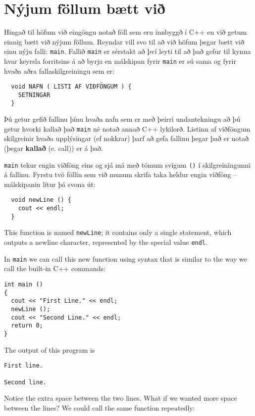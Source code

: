 \section{Nýjum föllum bætt við}

Hingað til höfum við eingöngu notað föll sem eru innbyggð í C++ en við getum einnig bætt við nýjum föllum.
Reyndar vill svo til að við höfum þegar bætt við einu nýju falli: {\tt main}.
Fallið {\tt main} er sérstakt að því leyti til að það gefur til kynna hvar keyrsla forritsins á að byrja en málskipan fyrir {\tt main} er sú sama og fyrir hvaða aðra fallaskilgreiningu sem er:

\begin{verbatim}
  void NAFN ( LISTI AF VIÐFÖNGUM ) {
    SETNINGAR
  }
\end{verbatim}
%
Þú getur gefið fallinu þínu hvaða nafn sem er með þeirri undantekningu að þú getur hvorki kallað það 
{\tt main} né notað annað C++ lykilorð.
Listinn af viðföngum skilgreinir hvaða upplýsingar (ef nokkrar) þarf að gefa fallinu þegar það er notað (þegar {\bf kallað} (e. call)) er á það.

{\tt main} tekur engin viðföng eins og sjá má með tómum svigum {\tt ()} í skilgreiningunni á fallinu.
Fyrstu tvö föllin sem við munum skrifa taka heldur engin viðföng -- málskipanin lítur þá svona út:

\begin{verbatim}
  void newLine () {
    cout << endl;
  }
\end{verbatim}
%
This function is named {\tt newLine}; it contains only a single
statement, which outputs a newline character, represented by
the special value {\tt endl}.

In {\tt main} we can call this new function using syntax that
is similar to the way we call the built-in C++ commands:

\begin{verbatim}
int main ()
{
  cout << "First Line." << endl;
  newLine ();
  cout << "Second Line." << endl;
  return 0;
}
\end{verbatim}
%
The output of this program is

\begin{verbatim}
First line.

Second line.
\end{verbatim}
%
Notice the extra space between the two lines.  What if we wanted
more space between the lines?  We could call the same
function repeatedly:

